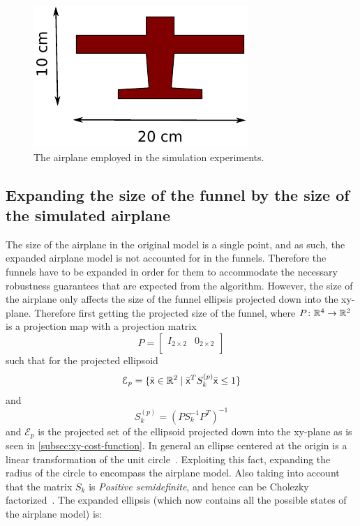 \begin{figure}
  \centering
  \includegraphics[scale=1.5]{figures/experiments/radio-vehicle-model}
  \caption{The airplane employed in the simulation experiments.}
  \label{fig:radio-vehicle}
\end{figure}

\subsection{Expanding the size of the funnel by the size of the simulated
  airplane}
\label{subsec:expand-funnel}

The size of the airplane in the original model is a single point, and as such,
the expanded airplane model is not accounted for in the funnels. Therefore the
funnels have to be expanded in order for them to accommodate the necessary
robustness guarantees that are expected from the algorithm. However, the size of
the airplane only affects the size of the funnel ellipsis projected down into
the xy-plane. Therefore first getting the projected size of the funnel, where
\(P \colon \mathbb{R}^4 \rightarrow \mathbb{R}^2\) is a projection map with a projection matrix
\[
  P =
  \begin{bmatrix}
    I_{2 \times 2} & {0}_{2 \times 2} \\
  \end{bmatrix}
\]
such that for the projected ellipsoid
\[
  \mathcal{E}_{p} = \lbrace\bar{{\mathbf{\mathsf{x}}}} \in \mathbb{R}^{2} \mid
    {\bar{{\mathbf{\mathsf{x}}}}}^{T}S_{k}^{(p)}\bar{{\mathbf{\mathsf{x}}}} \leq 1\rbrace
\]
and
\[
  S_{k}^{(p)} = {\left( PS_{k}^{-1}P^T \right)}^{-1}
\]
and \(\mathcal{E}_{p}\) is the projected set of the ellipsoid projected down
into the xy-plane as is seen in \cref{subsec:xy-cost-function}. In general an
ellipse centered at the origin is a linear transformation of the unit
circle~\cite{lay2005linear}. Exploiting this fact, expanding the radius of the
circle to encompass the airplane model. Also taking into account that the matrix
\(S_{k}\) is \textit{Positive semidefinite}, and hence can be Cholezky
factorized~\cite{lay2005linear}. The expanded ellipsis (which now contains all
the possible states of the airplane model) is:

